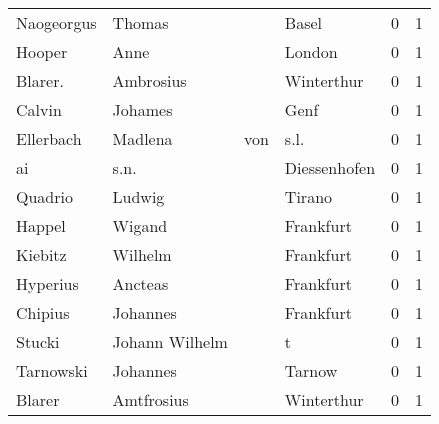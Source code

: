 \begin{tabular}{llllrr}
               Naogeorgus &                             Thomas &             &                                       Basel &          0 &         1 \\
                   Hooper &                               Anne &             &                                      London &          0 &         1 \\
                  Blarer. &                          Ambrosius &             &                                  Winterthur &          0 &         1 \\
                   Calvin &                            Johames &             &                                        Genf &          0 &         1 \\
                Ellerbach &                            Madlena &         von &                                        s.l. &          0 &         1 \\
                       ai &                               s.n. &             &                                Diessenhofen &          0 &         1 \\
                  Quadrio &                             Ludwig &             &                                      Tirano &          0 &         1 \\
                   Happel &                             Wigand &             &                                   Frankfurt &          0 &         1 \\
                  Kiebitz &                            Wilhelm &             &                                   Frankfurt &          0 &         1 \\
                 Hyperius &                            Ancteas &             &                                   Frankfurt &          0 &         1 \\
                  Chipius &                           Johannes &             &                                   Frankfurt &          0 &         1 \\
                   Stucki &                     Johann Wilhelm &             &                                           t &          0 &         1 \\
                Tarnowski &                           Johannes &             &                                      Tarnow &          0 &         1 \\
                   Blarer &                         Amtfrosius &             &                                  Winterthur &          0 &         1 \\

\end{tabular}
